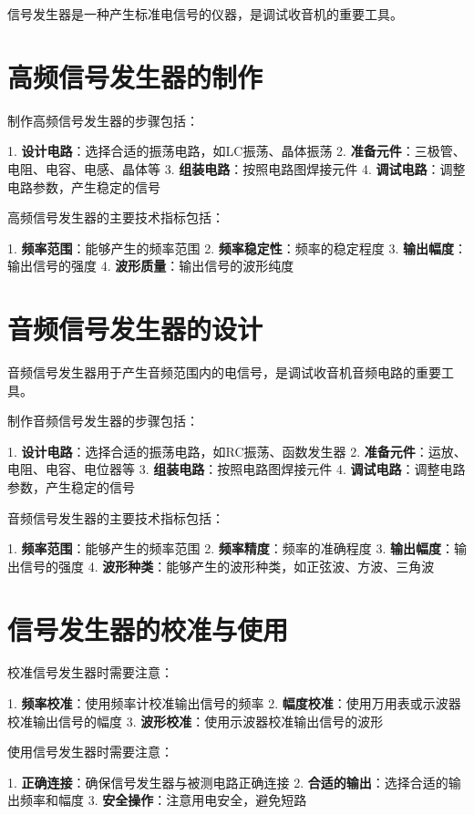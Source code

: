 \documentclass[12pt,UTF8]{ctexbook}
\begin{document}
信号发生器是一种产生标准电信号的仪器，是调试收音机的重要工具。

\section{高频信号发生器的制作}

制作高频信号发生器的步骤包括：

1. \textbf{设计电路}：选择合适的振荡电路，如LC振荡、晶体振荡
2. \textbf{准备元件}：三极管、电阻、电容、电感、晶体等
3. \textbf{组装电路}：按照电路图焊接元件
4. \textbf{调试电路}：调整电路参数，产生稳定的信号

高频信号发生器的主要技术指标包括：

1. \textbf{频率范围}：能够产生的频率范围
2. \textbf{频率稳定性}：频率的稳定程度
3. \textbf{输出幅度}：输出信号的强度
4. \textbf{波形质量}：输出信号的波形纯度

\section{音频信号发生器的设计}

音频信号发生器用于产生音频范围内的电信号，是调试收音机音频电路的重要工具。

制作音频信号发生器的步骤包括：

1. \textbf{设计电路}：选择合适的振荡电路，如RC振荡、函数发生器
2. \textbf{准备元件}：运放、电阻、电容、电位器等
3. \textbf{组装电路}：按照电路图焊接元件
4. \textbf{调试电路}：调整电路参数，产生稳定的信号

音频信号发生器的主要技术指标包括：

1. \textbf{频率范围}：能够产生的频率范围
2. \textbf{频率精度}：频率的准确程度
3. \textbf{输出幅度}：输出信号的强度
4. \textbf{波形种类}：能够产生的波形种类，如正弦波、方波、三角波

\section{信号发生器的校准与使用}

校准信号发生器时需要注意：

1. \textbf{频率校准}：使用频率计校准输出信号的频率
2. \textbf{幅度校准}：使用万用表或示波器校准输出信号的幅度
3. \textbf{波形校准}：使用示波器校准输出信号的波形

使用信号发生器时需要注意：

1. \textbf{正确连接}：确保信号发生器与被测电路正确连接
2. \textbf{合适的输出}：选择合适的输出频率和幅度
3. \textbf{安全操作}：注意用电安全，避免短路
\end{document}
